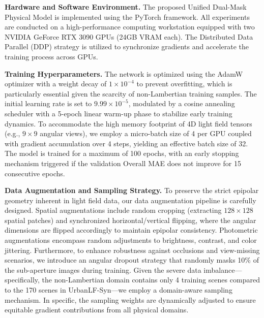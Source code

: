 \textbf{Hardware and Software Environment.} 
The proposed Unified Dual-Mask Physical Model is implemented using the PyTorch framework. All experiments are conducted on a high-performance computing workstation equipped with two NVIDIA GeForce RTX 3090 GPUs (24GB VRAM each). The Distributed Data Parallel (DDP) strategy is utilized to synchronize gradients and accelerate the training process across GPUs.

\textbf{Training Hyperparameters.} 
The network is optimized using the AdamW optimizer with a weight decay of $1 \times 10^{-4}$ to prevent overfitting, which is particularly essential given the scarcity of non-Lambertian training samples. The initial learning rate is set to $9.99 \times 10^{-5}$, modulated by a cosine annealing scheduler with a 5-epoch linear warm-up phase to stabilize early training dynamics. To accommodate the high memory footprint of 4D light field tensors (e.g., $9 \times 9$ angular views), we employ a micro-batch size of 4 per GPU coupled with gradient accumulation over 4 steps, yielding an effective batch size of 32. The model is trained for a maximum of 100 epochs, with an early stopping mechanism triggered if the validation Overall MAE does not improve for 15 consecutive epochs. 

\textbf{Data Augmentation and Sampling Strategy.} 
To preserve the strict epipolar geometry inherent in light field data, our data augmentation pipeline is carefully designed. Spatial augmentations include random cropping (extracting $128 \times 128$ spatial patches) and synchronized horizontal/vertical flipping, where the angular dimensions are flipped accordingly to maintain epipolar consistency. Photometric augmentations encompass random adjustments to brightness, contrast, and color jittering. Furthermore, to enhance robustness against occlusions and view-missing scenarios, we introduce an angular dropout strategy that randomly masks 10\% of the sub-aperture images during training. Given the severe data imbalance—specifically, the non-Lambertian domain contains only 4 training scenes compared to the 170 scenes in UrbanLF-Syn—we employ a domain-aware sampling mechanism. In specific, the sampling weights are dynamically adjusted to ensure equitable gradient contributions from all physical domains.

